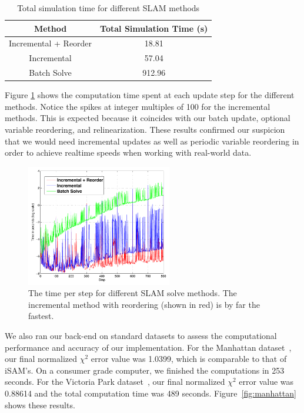 \documentclass[conference]{IEEEtran}
\begin{document}
\begin{table}[!t]
\renewcommand{\arraystretch}{1.3}
\caption{Total simulation time for different \ac{SLAM} methods}
\label{tab:timing}
\centering
\begin{tabular}{|c|c|}
\hline
Method & Total Simulation Time (s) \\
\hline
Incremental + Reorder & 18.81 \\
Incremental & 57.04 \\
Batch Solve & 912.96 \\
\hline
\end{tabular}
\end{table}

Figure \ref{fig:stepTime} shows the computation time spent at each update step for the
different methods. Notice the spikes at integer multiples of 100 for the incremental
methods. This is expected because it coincides with our batch update, optional variable
reordering, and relinearization. These results confirmed our suspicion that we would need
incremental updates as well as periodic variable reordering in order to achieve realtime
speeds when working with real-world data.

\begin{figure}[!t]
  \centering
  \includegraphics[width=2.5in]{images/stepTimeResults}
  \caption{The time per step for different \ac{SLAM} solve methods.  The incremental
    method with reordering (shown in red) is by far the fastest.}
  \label{fig:stepTime}
\end{figure}

We also ran our back-end on standard datasets to assess the computational performance and
accuracy of our implementation. For the Manhattan dataset~\cite{olson2006fast}, our final
normalized $\chi^2$ error value was 1.0399, which is comparable to that of iSAM's. On a
consumer grade computer, we finished the computations in 253 seconds. For the Victoria
Park dataset~\cite{Guivant00autonomousnavigation}, our final normalized $\chi^2$ error
value was 0.88614 and the total computation time was 489 seconds.
Figure~\ref{fig:manhattan} shows these results.
\end{document}
